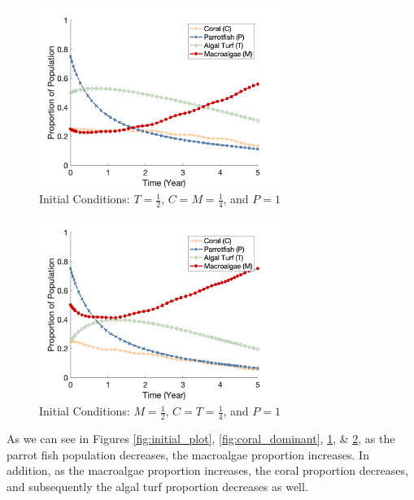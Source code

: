 \documentclass[12pt]{article}
\begin{document}
\begin{figure}[H]
    \centering
    \includegraphics[width=0.7\textwidth]{Latex/Figures/Graphs/0.25C_0.5T_0.25M.png}
    \caption{Initial Conditions: $T = \frac{1}{2}$, $C = M = \frac{1}{4}$, and $P = 1$}
    \label{fig:turf_dominant}
\end{figure}
\begin{figure}[H]
    \centering
    \includegraphics[width=0.7\textwidth]{Latex/Figures/Graphs/0.25C_0.25T_0.5M.png}
    \caption{Initial Conditions: $M = \frac{1}{2}$, $C = T = \frac{1}{4}$, and $P = 1$}
    \label{fig:macroalgae_dominant}
\end{figure}
As we can see in Figures \ref{fig:initial_plot}, \ref{fig:coral_dominant}, \ref{fig:turf_dominant}, \& \ref{fig:macroalgae_dominant}, as the parrot fish population decreases, the macroalgae proportion increases. In addition, as the macroalgae proportion increases, the coral proportion decreases, and subsequently the algal turf proportion decreases as well.\\
\end{document}
